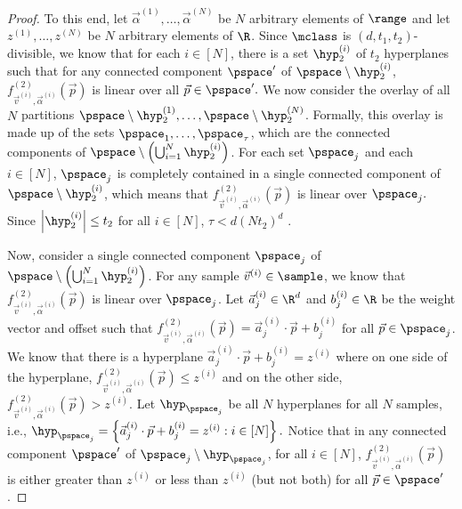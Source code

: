 \begin{proof}
To this end, let $\vec{\alpha}^{(1)}, \dots, \vec{\alpha}^{(N)}$ be $N$ arbitrary elements of $\range$ and let $z^{(1)}, \dots, z^{(N)}$ be $N$ arbitrary elements of $\R$. Since $\mclass$ is $(d, t_1, t_2)$-divisible, we know that for each $i \in [N]$, there is a set $\hyp_2^{(i)}$ of $t_2$ hyperplanes such that for any connected component $\pspace'$ of $\pspace \setminus \hyp_2^{(i)}$, $f^{(2)}_{\vec{v}^{(i)}, \vec{\alpha}^{(i)}}\left(\vec{p}\right)$ is linear over all $\vec{p} \in \pspace'.$  We now consider the overlay of all $N$ partitions $\pspace\setminus \hyp_2^{(1)}, \dots, \pspace\setminus \hyp_2^{(N)}$. Formally, this overlay is made up of the sets $\pspace_1, \dots, \pspace_{\tau}$, which are the connected components 
of $\pspace \setminus \left(\bigcup_{i = 1}^N \hyp_2^{(i)}\right)$. For each set $\pspace_j$ and each $i \in [N]$, $\pspace_j$ is completely contained in a single connected component of $\pspace \setminus \hyp_2^{(i)}$, which means that $f^{(2)}_{\vec{v}^{(i)}, \vec{\alpha}^{(i)}}\left(\vec{p}\right)$ is linear over $\pspace_j.$
Since $\left|\hyp^{(i)}_2\right|\leq t_2$ for all $i \in [N]$, $\tau < d(Nt_2)^d$ \citep{Buck43:Partition}.

Now, consider a single connected component $\pspace_j$ of $\pspace \setminus \left(\bigcup_{i = 1}^N \hyp^{(i)}_2\right)$. For any sample $\vec{v}^{(i)} \in \sample$, 
we know that $f^{(2)}_{\vec{v}^{(i)}, \vec{\alpha}^{(i)}}\left(\vec{p}\right)$ is linear over $\pspace_j$. 
Let $\vec{a}_j^{(i)} \in \R^d$ and $b_j^{(i)} \in \R$ be the weight vector and offset 
such that $f^{(2)}_{\vec{v}^{(i)}, \vec{\alpha}^{(i)}}\left(\vec{p}\right) = \vec{a}_j^{(i)} \cdot \vec{p} + b_j^{(i)}$ for all $\vec{p} \in \pspace_j$. We know that there is a hyperplane $\vec{a}_j^{(i)} \cdot \vec{p} + b_j^{(i)} = z^{(i)}$ where on one side of the 
hyperplane, $f^{(2)}_{\vec{v}^{(i)}, \vec{\alpha}^{(i)}}\left(\vec{p}\right) \leq z^{(i)}$ and on the other 
side, $f^{(2)}_{\vec{v}^{(i)}, \vec{\alpha}^{(i)}}\left(\vec{p}\right) > z^{(i)}$.
Let $\hyp_{\pspace_j}$ be all $N$ hyperplanes for all $N$ samples, i.e., $\hyp_{\pspace_j} = \left\{\vec{a}_j^{(i)} \cdot \vec{p} + b_j^{(i)} = z^{(i)} : i \in [N]\right\}.$ Notice that in any 
connected component $\pspace'$ of $\pspace_j \setminus \hyp_{\pspace_j}$, for all $i \in [N]$, $f^{(2)}_{\vec{v}^{(i)}, \vec{\alpha}^{(i)}}\left(\vec{p}\right)$ is either greater than $z^{(i)}$ or 
less than $z^{(i)}$ (but not both) for all $\vec{p} \in \pspace'$. 


\end{proof}
